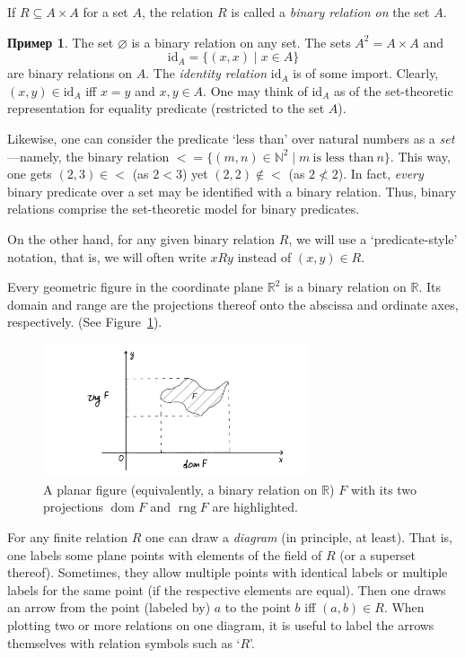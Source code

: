 \documentclass[12pt,notitlepage]{article}
\theoremstyle{plain}
\theoremstyle{definition}
\newtheorem{exm}[thm]{Пример}
\theoremstyle{plain}
\newcommand{\N}{\mathbb{N}}
\newcommand{\R}{\mathbb{R}}
\newcommand{\sbs}{\subseteq}
\newcommand{\void}{\varnothing}
\newcommand{\dom}{\mathop{\mathrm{dom}}}
\newcommand{\rng}{\mathop{\mathrm{rng}}}
\newcommand{\id}{\mathrm{id}}
\newcommand{\1}{\mathbf{1}}
\newcommand{\0}{\mathbf{0}}
\begin{document}
If $R \sbs A \times A$ for a set $A$, the relation $R$ is called a \emph{binary relation on} the set $A$.
\begin{exm}
	The set $\void$ is a binary relation on any set. The sets $A^2 = A \times A$ and
	$$\id_A = \{(x,x) \mid x \in A \}$$
	are binary relations on $A$. The \emph{identity relation} $\id_A$ is of some import. Clearly, $(x,y) \in \id_A$ iff $x = y$ and $x,y \in A$. One may think of $\id_A$ as of the set-theoretic representation for equality predicate (restricted to the set $A$).
	
	Likewise, one can consider the predicate `less than' over natural numbers as a \emph{set}---namely, the binary relation ${<} = \{ (m, n) \in \N^2 \mid m\ \mbox{is less than}\ n\}$. This way, one gets $(2,3) \in {<}$ (as $2 < 3$) yet $(2,2) \notin {<}$ (as $2 \not< 2$). In fact, \emph{every} binary predicate over a set may be identified with a binary relation. Thus, binary relations comprise the set-theoretic model for binary predicates.
	
	On the other hand, for any given binary relation $R$, we will use a `predicate-style' notation, that is, we will often write $x R y$ instead of $(x,y) \in R$.
	
	Every geometric figure in the coordinate plane $\R^2$ is a binary relation on $\R$. Its domain and range are the projections thereof onto the abscissa and ordinate axes, respectively. (See Figure~\ref{rel:proj}).
	\begin{figure}[h]
		\centering
		\includegraphics*[width=0.7\textwidth]{rel_proj.pdf}
		\caption{\label{rel:proj} A planar figure (equivalently, a binary relation on $\R$) $F$ with its two projections $\dom F$ and $\rng F$ are highlighted.}
	\end{figure}
\end{exm}

For any finite relation $R$ one can draw a \emph{diagram} (in principle, at least). That is, one labels some plane points with elements of the field of $R$ (or a superset thereof). Sometimes, they allow multiple points with identical labels or multiple labels for the same point (if the respective elements are equal). Then one draws an arrow from the point (labeled by) $a$ to the point $b$ iff $(a,b) \in R$. When plotting two or more relations on one diagram, it is useful to label the arrows themselves with relation symbols such as `$R$'.
\end{document}

